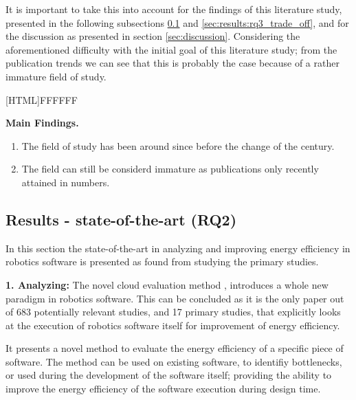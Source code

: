 \vspace{2mm}

It is important to take this into account for the findings of this literature study, presented in the following subsections 
\ref{sec:results:rq2_state_of_the_art} and \ref{sec:results:rq3_trade_off}, and for the discussion as presented in section \ref{sec:discussion}.
Considering the aforementioned difficulty with the initial goal of this literature study; from the publication trends we can see that this 
is probably the case because of a rather immature field of study.

\vspace{5mm}

\noindent{}[HTML]{FFFFFF}{\parbox{0.47\textwidth}{%
\noindent \textbf{Main Findings.}
\begin{enumerate}[nolistsep]
\item The field of study has been around since before the change of the century.
\item The field can still be considerd immature as publications only recently attained in numbers.
\end{enumerate}}}

\newpage

\subsection{Results - state-of-the-art (RQ2)}
\label{sec:results:rq2_state_of_the_art}
In this section the state-of-the-art in analyzing and improving energy efficiency in robotics software is presented as found from studying the primary studies.

\vspace{5mm}

\noindent\textbf{1. Analyzing:}
The novel cloud evaluation method \cite{hou2017novel_cloud_evaluation_model}, introduces a whole new paradigm in robotics software.
This can be concluded as it is the only paper out of 683 potentially relevant studies, and 17 primary studies, 
that explicitly looks at the execution of robotics software itself for improvement of energy efficiency.

It presents a novel method to evaluate the energy efficiency of a specific piece of software.
The method can be used on existing software, to identifiy bottlenecks, or used during the development of the software itself;
providing the ability to improve the energy efficiency of the software execution during design time.

